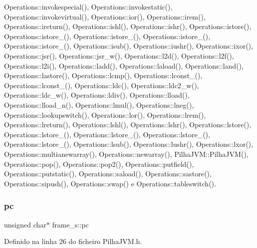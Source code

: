 Operations\+::invokespecial(), Operations\+::invokestatic(), Operations\+::invokevirtual(), Operations\+::ior(), Operations\+::irem(), Operations\+::ireturn(), Operations\+::ishl(), Operations\+::ishr(), Operations\+::istore(), Operations\+::istore\+\_(), Operations\+::istore\+\_(), Operations\+::istore\+\_(), Operations\+::istore\+\_(), Operations\+::isub(), Operations\+::iushr(), Operations\+::ixor(), Operations\+::jsr(), Operations\+::jsr\+\_\+w(), Operations\+::l2d(), Operations\+::l2f(), Operations\+::l2i(), Operations\+::ladd(), Operations\+::laload(), Operations\+::land(), Operations\+::lastore(), Operations\+::lcmp(), Operations\+::lconst\+\_(), Operations\+::lconst\+\_(), Operations\+::ldc(), Operations\+::ldc2\+\_\+w(), Operations\+::ldc\+\_\+w(), Operations\+::ldiv(), Operations\+::lload(), Operations\+::lload\+\_\+n(), Operations\+::lmul(), Operations\+::lneg(), Operations\+::lookupswitch(), Operations\+::lor(), Operations\+::lrem(), Operations\+::lreturn(), Operations\+::lshl(), Operations\+::lshr(), Operations\+::lstore(), Operations\+::lstore\+\_(), Operations\+::lstore\+\_(), Operations\+::lstore\+\_(), Operations\+::lstore\+\_(), Operations\+::lsub(), Operations\+::lushr(), Operations\+::lxor(), Operations\+::multianewarray(), Operations\+::newarray(), Pilha\+J\+V\+M\+::\+Pilha\+J\+V\+M(), Operations\+::pop(), Operations\+::pop2(), Operations\+::putfield(), Operations\+::putstatic(), Operations\+::saload(), Operations\+::sastore(), Operations\+::sipush(), Operations\+::swap() e Operations\+::tableswitch().

\mbox{\label{structframe__s_a74703c716b34b0be42af1c698ef9f621}} 
\subsubsection{\texorpdfstring{pc}{pc}}
{\footnotesize\ttfamily unsigned char$\ast$ frame\+\_\+s\+::pc}



Definido na linha 26 do ficheiro Pilha\+J\+V\+M.\+h.



